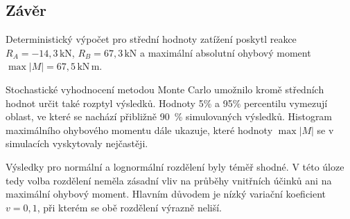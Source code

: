 \subsection*{Závěr}

Deterministický výpočet pro střední hodnoty zatížení poskytl reakce \(R_A=-14{,}3\,\mathrm{kN}\), \(R_B=67{,}3\,\mathrm{kN}\) a maximální absolutní ohybový moment \(\max |M|=67{,}5\,\mathrm{kN\,m}\).

Stochastické vyhodnocení metodou Monte Carlo umožnilo kromě středních hodnot určit také rozptyl výsledků. Hodnoty 5\% a 95\% percentilu vymezují oblast, ve které se nachází přibližně 90~\% simulovaných výsledků. Histogram maximálního ohybového momentu dále ukazuje, které hodnoty \(\max |M|\) se v simulacích vyskytovaly nejčastěji.

Výsledky pro normální a lognormální rozdělení byly téměř shodné. V této úloze tedy volba rozdělení neměla zásadní vliv na průběhy vnitřních účinků ani na maximální ohybový moment. Hlavním důvodem je nízký variační koeficient \(v=0{,}1\), při kterém se obě rozdělení výrazně neliší.
